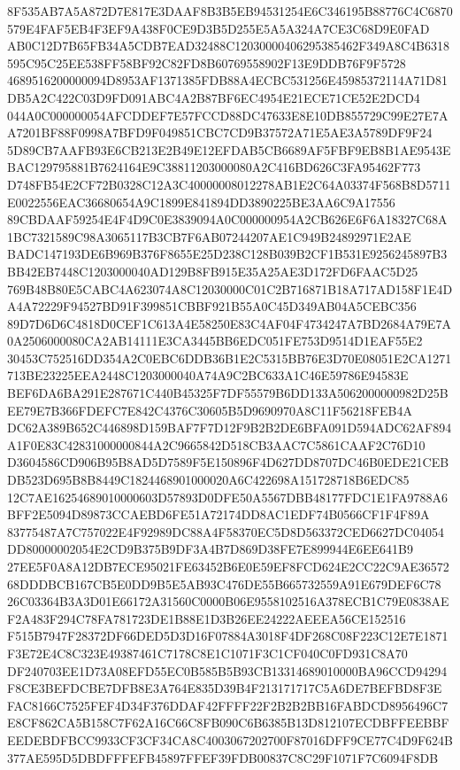 \documentclass[UTF8,fontset=fandol,zihao=-4,a4paper]{ctexart}
\begin{document}
{{8F535AB7A5A872D7E817E3DAAF8B3B5EB94531254E6C346195B88776C4C6870579E4FAF5EB4F3EF9A438F0CE9D3B5D255E5A5A324A7CE3C68D9E0FAD
AB0C12D7B65FB34A5CDB7EAD32488C12030000406295385462F349A8C4B6318595C95C25EE538FF58BF92C82FD8B60769558902F13E9DDB76F9F5728
4689516200000094D8953AF1371385FDB88A4ECBC531256E45985372114A71D81DB5A2C422C03D9FD091ABC4A2B87BF6EC4954E21ECE71CE52E2DCD4
044A0C000000054AFCDDEF7E57FCCD88DC47633E8E10DB855729C99E27E7AA7201BF88F0998A7BFD9F049851CBC7CD9B37572A71E5AE3A5789DF9F24
5D89CB7AAFB93E6CB213E2B49E12EFDAB5CB6689AF5FBF9EB8B1AE9543EBAC129795881B7624164E9C38811203000080A2C416BD626C3FA95462F773
D748FB54E2CF72B0328C12A3C40000008012278AB1E2C64A03374F568B8D5711E0022556EAC36680654A9C1899E841894DD3890225BE3AA6C9A17556
89CBDAAF59254E4F4D9C0E3839094A0C000000954A2CB626E6F6A18327C68A1BC7321589C98A3065117B3CB7F6AB07244207AE1C949B24892971E2AE
BADC147193DE6B969B376F8655E25D238C128B039B2CF1B531E9256245897B3BB42EB7448C1203000040AD129B8FB915E35A25AE3D172FD6FAAC5D25
769B48B80E5CABC4A623074A8C12030000C01C2B716871B18A717AD158F1E4DA4A72229F94527BD91F399851CBBF921B55A0C45D349AB04A5CEBC356
89D7D6D6C4818D0CEF1C613A4E58250E83C4AF04F4734247A7BD2684A79E7A0A2506000080CA2AB14111E3CA3445BB6EDC051FE753D9514D1EAF55E2
30453C752516DD354A2C0EBC6DDB36B1E2C5315BB76E3D70E08051E2CA1271713BE23225EEA2448C1203000040A74A9C2BC633A1C46E59786E94583E
BEF6DA6BA291E287671C440B45325F7DF55579B6DD133A5062000000982D25BEE79E7B366FDEFC7E842C4376C30605B5D9690970A8C11F56218FEB4A
DC62A389B652C446898D159BAF7F7D12F9B2B2DE6BFA091D594ADC62AF894A1F0E83C42831000000844A2C9665842D518CB3AAC7C5861CAAF2C76D10
D3604586CD906B95B8AD5D7589F5E150896F4D627DD8707DC46B0EDE21CEBDB523D695B8B8449C1824468901000020A6C422698A151728718B6EDC85
12C7AE16254689010000603D57893D0DFE50A5567DBB48177FDC1E1FA9788A6BFF2E5094D89873CCAEBD6FE51A72174DD8AC1EDF74B0566CF1F4F89A
83775487A7C757022E4F92989DC88A4F58370EC5D8D563372CED6627DC04054DD80000002054E2CD9B375B9DF3A4B7D869D38FE7E899944E6EE641B9
27EE5F0A8A12DB7ECE95021FE63452B6E0E59EF8FCD624E2CC22C9AE3657268DDDBCB167CB5E0DD9B5E5AB93C476DE55B665732559A91E679DEF6C78
26C03364B3A3D01E66172A31560C0000B06E9558102516A378ECB1C79E0838AEF2A483F294C78FA781723DE1B88E1D3B26EE24222AEEEA56CE152516
F515B7947F28372DF66DED5D3D16F07884A3018F4DF268C08F223C12E7E1871F3E72E4C8C323E49387461C7178C8E1C1071F3C1CF040C0FD931C8A70
DF240703EE1D73A08EFD55EC0B585B5B93CB13314689010000BA96CCD94294F8CE3BEFDCBE7DFB8E3A764E835D39B4F213171717C5A6DE7BEFBD8F3E
FAC8166C7525FEF4D34F376DDAF42FFFF22F2B2B2BB16FABDCD8956496C7E8CF862CA5B158C7F62A16C66C8FB090C6B6385B13D812107ECDBFFEEBBF
EEDEBDFBCC9933CF3CF34CA8C4003067202700F87016DFF9CE77C4D9F624B377AE595D5DBDFFFEFB45897FFEF39FDB00837C8C29F1071F7C6094F8DB
}}
\end{document}
